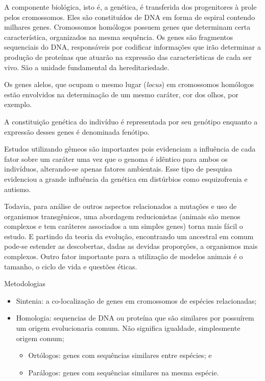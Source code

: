 \documentclass[
	article,			%
	12pt,				%
	oneside,			%
	a4paper,			%
	english,			%
	brazil,				%
	sumario=tradicional
	]{abntex2}
\begin{document}
A componente biológica, isto é, a genética, é transferida dos progenitores à prole pelos cromossomos.
Eles são constituídos de DNA em forma de espiral contendo milhares genes.
Cromossomos homólogos possuem genes que determinam certa característica, organizados na mesma sequência. Os genes são  fragmentos sequenciais do DNA, responsáveis por codificar informações que irão determinar a produção de proteínas que atuarão na expressão das características de cada ser vivo. São a unidade fundamental da hereditariedade.

Os genes alelos, que ocupam o mesmo lugar (\textit{locus}) em cromossomos homólogos estão envolvidos na determinação de um mesmo caráter, cor dos olhos, por exemplo.

A constituição genética do indivíduo é representada por seu genótipo enquanto a expressão desses genes é denominada fenótipo.

Estudos utilizando gêmeos são importantes pois evidenciam a influência de cada fator sobre um caráter uma vez que o genoma é idêntico para ambos os indivíduos, alterando-se apenas fatores ambientais. Esse tipo de pesquisa evidenciou a grande influência da genética em distúrbios como esquizofrenia e autismo.

Todavia, para análise de outros aspectos relacionados a mutações e uso de organismos transgênicos, uma abordagem reducionistas (animais são menos complexos e tem caráteres associados a um simples genes) torna mais fácil o estudo. E partindo da teoria da evolução, encontrando um ancestral em comum pode-se estender as descobertas, dadas as devidas proporções, a organismos mais complexos. Outro fator importante para a utilização de modelos animais é o tamanho, o ciclo de vida e questões éticas.

Metodologias
\begin{itemize}
    \item Sintenia:	a	co-localização	de	genes	em cromossomos	de	espécies relacionadas;
    \item Homologia:	sequencias	de	DNA	ou proteína	que	são similares	por	 possuírem	um	origem	evolucionaria comum. Não significa igualdade, simplesmente origem comum;
    \begin{itemize}
            \item Ortólogos:	genes	com	sequências	 similares	entre espécies; e
            \item Parálogos: genes	com	sequências	 similares	na	mesma espécie.
    \end{itemize}
\end{itemize}
	
\end{document}
